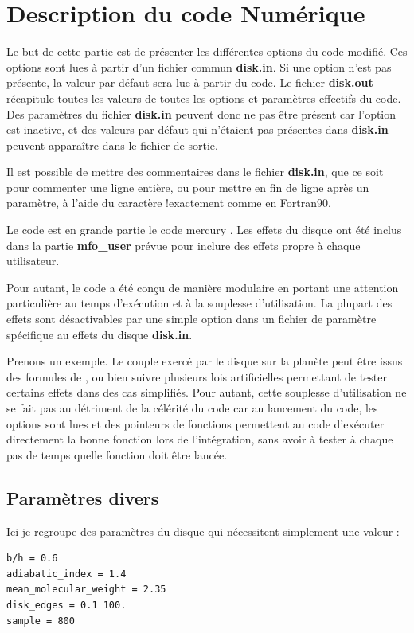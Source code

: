 \chapter{Description du code Numérique}\label{sec:nbody-readme}
Le but de cette partie est de présenter les différentes options du code modifié. Ces options sont lues à partir d'un fichier commun \textbf{disk.in}. Si une option n'est pas présente, la valeur par défaut sera lue à partir du code. Le fichier \textbf{disk.out} récapitule toutes les valeurs de toutes les options et paramètres effectifs du code. Des paramètres du fichier \textbf{disk.in} peuvent donc ne pas être présent car l'option est inactive, et des valeurs par défaut qui n'étaient pas présentes dans \textbf{disk.in} peuvent apparaître dans le fichier de sortie.

Il est possible de mettre des commentaires dans le fichier \textbf{disk.in}, que ce soit pour commenter une ligne entière, ou pour mettre en fin de ligne après un paramètre, à l'aide du caractère \og !\fg exactement comme en Fortran90.

Le code est en grande partie le code mercury \cite{chambers1999hybrid}. Les effets du disque ont été inclus dans la partie \textbf{mfo\_user} prévue pour inclure des effets propre à chaque utilisateur. 

Pour autant, le code a été conçu de manière modulaire en portant une attention particulière au temps d'exécution et à la souplesse d'utilisation. La plupart des effets sont désactivables par une simple option dans un fichier de paramètre spécifique au effets du disque \textbf{disk.in}. 

Prenons un exemple. Le couple exercé par le disque sur la planète peut être issus des formules de \cite{paardekooper2011torque}, ou bien suivre plusieurs lois artificielles permettant de tester certains effets dans des cas simplifiés. Pour autant, cette souplesse d'utilisation ne se fait pas au détriment de la célérité du code car au lancement du code, les options sont lues et des pointeurs de fonctions permettent au code d'exécuter directement la bonne fonction lors de l'intégration, sans avoir à tester à chaque pas de temps quelle fonction doit être lancée. 

\section{Paramètres divers}
Ici je regroupe des paramètres du disque qui nécessitent simplement une valeur : 
\begin{verbatim}
b/h = 0.6
adiabatic_index = 1.4
mean_molecular_weight = 2.35
disk_edges = 0.1 100.
sample = 800
\end{verbatim}


